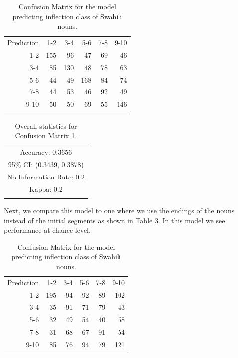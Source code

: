 \begin{table}[!htpb]
  \centering
  \begin{tabular}{rrrrrr}
    \lsptoprule
    \multicolumn{6}{c}{Reference}             \\
    \midrule
    Prediction & 1-2 & 3-4 & 5-6 & 7-8 & 9-10 \\
    1-2        & 155 & 96  & 47  & 69  & 46   \\
    3-4        & 85  & 130 & 48  & 78  & 63   \\
    5-6        & 44  & 49  & 168 & 84  & 74   \\
    7-8        & 44  & 53  & 46  & 92  & 49   \\
    9-10       & 50  & 50  & 69  & 55  & 146  \\
    \lspbottomrule
  \end{tabular}
  \caption{Confusion Matrix for the model predicting inflection class of Swahili nouns.}\label{tab:class-swa}
\end{table}

\begin{table}[!htpb]
  \centering
  \begin{tabular}{lllrrr}
    \lsptoprule
    \multicolumn{6}{c}{Overall statistics:} \\

    \midrule
    \multicolumn{6}{c}{Accuracy: 0.3656}            \\
    \multicolumn{6}{c}{95\% CI: (0.3439, 0.3878)}   \\
    \multicolumn{6}{c}{No Information Rate: 0.2} \\
    \multicolumn{6}{c}{Kappa: 0.2}               \\
    \lspbottomrule
  \end{tabular}
  \caption{Overall statistics for Confusion Matrix \ref{tab:class-swa}.}\label{tab:class-swa-stats}
\end{table}

Next, we compare this model to one where we use the endings of the nouns instead of the initial segments as shown in Table \ref{tab:class-swa-last}. In this model we see performance at chance level.

\begin{table}[!htpb]
  \centering
  \begin{tabular}{rrrrrr}
    \lsptoprule
    \multicolumn{6}{c}{Reference}             \\
    \midrule
    Prediction & 1-2 & 3-4 & 5-6 & 7-8 & 9-10 \\
    1-2        & 195 & 94  & 92  & 89  & 102  \\
    3-4        & 35  & 91  & 71  & 79  & 43   \\
    5-6        & 32  & 49  & 54  & 40  & 58   \\
    7-8        & 31  & 68  & 67  & 91  & 54   \\
    9-10       & 85  & 76  & 94  & 79  & 121  \\
    \lspbottomrule
  \end{tabular}
  \caption{Confusion Matrix for the model predicting inflection class of Swahili nouns.}\label{tab:class-swa-last}
\end{table}

